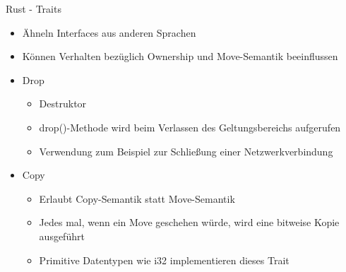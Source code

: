 \begin{frame}{Rust - Traits}

  \begin{itemize}
    \item Ähneln Interfaces aus anderen Sprachen
    \item Können Verhalten bezüglich Ownership und Move-Semantik beeinflussen
    \item<2-> Drop
      \begin{itemize}
        \item Destruktor
        \item drop()-Methode wird beim Verlassen des Geltungsbereichs aufgerufen
        \item Verwendung zum Beispiel zur Schließung einer Netzwerkverbindung
      \end{itemize}
    \item<3-> Copy
      \begin{itemize}
        \item Erlaubt Copy-Semantik statt Move-Semantik
        \item Jedes mal, wenn ein Move geschehen würde, wird eine bitweise Kopie ausgeführt
        \item Primitive Datentypen wie i32 implementieren dieses Trait
      \end{itemize}
  \end{itemize}
\end{frame}